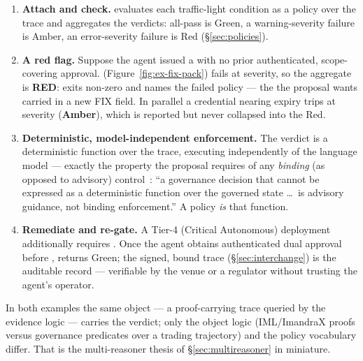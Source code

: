 \begin{enumerate}
\item \textbf{Attach and check.}  evaluates each traffic-light condition as
a policy over the trace and aggregates the verdicts: all-pass is Green, a warning-severity failure is Amber, an
error-severity failure is Red (\S\ref{sec:policies}).

\item \textbf{A red flag.} Suppose the agent issued a  with no prior authenticated,
scope-covering approval.  (Figure~\ref{fig:ex-fix-pack})
fails at  severity, so the aggregate is \textbf{RED}:  exits non-zero and
names the failed policy --- the  the proposal wants carried in a new FIX field. In
parallel a credential nearing expiry trips  at  severity
(\textbf{Amber}), which is reported but never collapsed into the Red.

\item \textbf{Deterministic, model-independent enforcement.} The verdict is a deterministic function over the
trace, executing independently of the language model --- exactly the property the proposal requires of any
\emph{binding} (as opposed to advisory) control~\cite[\S10.3]{fixgov}: ``a governance decision that cannot be
expressed as a deterministic function over the governed state \ldots\ is advisory guidance, not binding
enforcement.'' A  policy \emph{is} that function.

\item \textbf{Remediate and re-gate.} A Tier-4 (Critical Autonomous) deployment additionally requires
. Once the agent obtains authenticated dual approval before ,
 returns Green; the signed, bound trace (\S\ref{sec:interchange}) is the auditable
 record --- verifiable by the venue or a regulator without trusting the agent's operator.
\end{enumerate}

In both examples the same object --- a proof-carrying trace queried by the evidence logic --- carries the
verdict; only the object logic (IML/ImandraX proofs versus governance predicates over a trading trajectory)
and the policy vocabulary differ. That is the multi-reasoner thesis of \S\ref{sec:multireasoner} in miniature.
